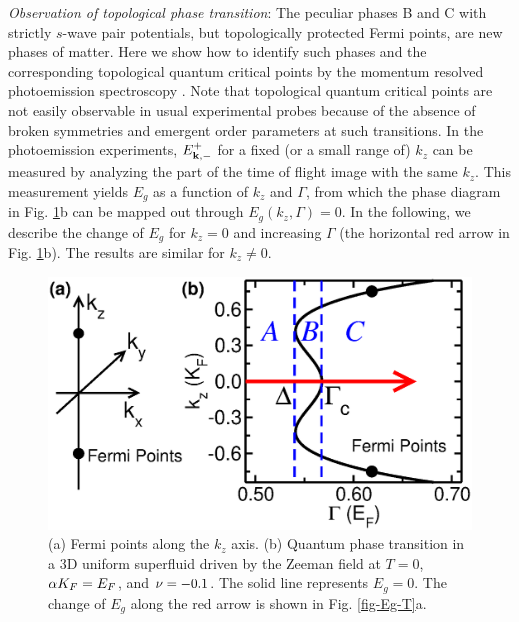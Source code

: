 \documentclass[prl,showpacs,twocolumn]{revtex4-1}
\begin{document}
\emph{Observation of topological phase transition}: The peculiar phases B
and C with strictly $s$-wave pair potentials, but topologically protected
Fermi points, are new phases of matter. Here we show how to identify such
phases and the corresponding topological quantum critical points by the
momentum resolved photoemission spectroscopy \cite{Jin1,Jin2}. Note that
topological quantum critical points are not easily observable in usual
experimental probes because of the absence of broken symmetries and emergent
order parameters at such transitions. In the photoemission experiments, $E_{%
\mathbf{k},-}^{+}$ for a fixed (or a small range of) $k_{z}$ can be measured
by analyzing the part of the time of flight image with the same $k_{z}$.
This measurement yields $E_{g}$ as a function of $k_{z}$ and $\Gamma $, from
which the phase diagram in Fig. \ref{fig-phase}b can be mapped out through $%
E_{g}\left( k_{z},\Gamma \right) =0$. In the following, we describe the
change of $E_{g}$ for $k_{z}=0$ and increasing $\Gamma $ (the horizontal red
arrow in Fig. \ref{fig-phase}b). The results are similar for $k_{z}\neq 0$.

\begin{figure}[t]
\centering\includegraphics[width = 0.76\linewidth]{phase-ABC.eps}\vspace{%
-10pt}
\caption{(a) Fermi points along the $k_{z}$ axis. (b) Quantum phase
transition in a 3D uniform superfluid driven by the Zeeman field at $T=0$, $%
\protect\alpha K_{F}=E_{F}$, and $\protect\nu =-0.1$. The solid line
represents $E_{g}=0$. The change of $E_{g}$ along the red arrow is shown in
Fig. \protect\ref{fig-Eg-T}a.}
\label{fig-phase}
\end{figure}
\end{document}
